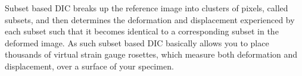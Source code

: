 \documentclass[12pt,oneside,openany,a4paper, %
english, %
masters-t, goldenblock]{usthesis}
\begin{document}












Subset based DIC breaks up the reference image into clusters of pixels, called subsets, and then determines the deformation and displacement experienced by each subset such that it becomes identical to a corresponding subset in the deformed image. As such subset based DIC basically allows you to place thousands of virtual strain gauge rosettes, which measure both deformation and displacement, over a surface of your specimen. 
\end{document}

